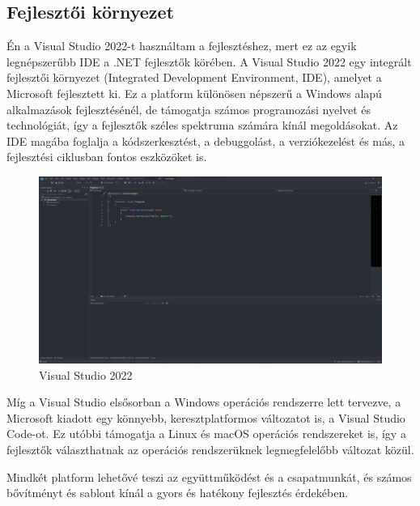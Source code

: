 \subsection*{Fejlesztői környezet}
Én a Visual Studio 2022-t használtam a fejlesztéshez, mert ez az egyik legnépszerűbb IDE a .NET fejlesztők körében.
A Visual Studio 2022 egy integrált fejlesztői környezet (Integrated Development Environment, IDE), amelyet a Microsoft fejlesztett ki. Ez a platform különösen népszerű a Windows alapú alkalmazások fejlesztésénél, de támogatja számos programozási nyelvet és technológiát, így a fejlesztők széles spektruma számára kínál megoldásokat. Az IDE magába foglalja a kódszerkesztést, a debuggolást, a verziókezelést és más, a fejlesztési ciklusban fontos eszközöket is.
\begin{figure}[H]
    \centering
    \includegraphics[width=12.0truecm]{images/VisualStuido2022.png}
    \caption{Visual Studio 2022}
    \label{fig:VisualStuido2022}
\end{figure}
Míg a Visual Studio elsősorban a Windows operációs rendszerre lett tervezve, a Microsoft kiadott egy könnyebb, keresztplatformos változatot is, a Visual Studio Code-ot. Ez utóbbi támogatja a Linux és macOS operációs rendszereket is, így a fejlesztők választhatnak az operációs rendszerüknek legmegfelelőbb változat közül.

Mindkét platform lehetővé teszi az együttműködést és a csapatmunkát, és számos bővítményt és sablont kínál a gyors és hatékony fejlesztés érdekében.